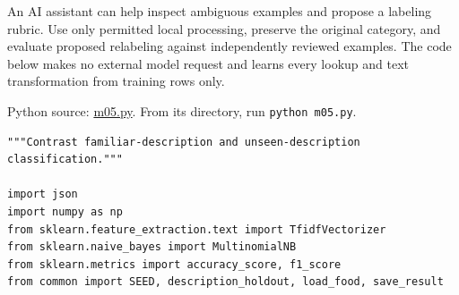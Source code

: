 An AI assistant can help inspect ambiguous examples and propose a
labeling rubric. Use only permitted local processing, preserve the
original category, and evaluate proposed relabeling against
independently reviewed examples. The code below makes no external model
request and learns every lookup and text transformation from training
rows only.

\FloatBarrier
{}
Python source:
\href{../03_Data_and_Code/mHealth/recurring_examples/m05.py}{m05.py}.
From its directory, run \texttt{python\ m05.py}.

\begin{Verbatim}[breaklines,breakanywhere,fontsize=\small]
"""Contrast familiar-description and unseen-description classification."""

import json
import numpy as np
from sklearn.feature_extraction.text import TfidfVectorizer
from sklearn.naive_bayes import MultinomialNB
from sklearn.metrics import accuracy_score, f1_score
from common import SEED, description_holdout, load_food, save_result


\end{Verbatim}
